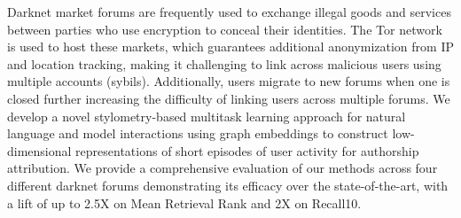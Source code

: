 Darknet market forums are frequently used to exchange illegal goods and services between parties who use encryption to conceal their identities. The Tor network is used to host these markets, which guarantees additional anonymization from IP and location tracking, making it challenging to link across malicious users using multiple accounts (sybils). Additionally, users migrate to new forums when one is closed further increasing the difficulty of linking users across multiple forums. We develop a novel stylometry-based multitask learning approach for natural language and model interactions using graph embeddings to construct low-dimensional representations of short episodes of user activity for authorship attribution. We provide a comprehensive evaluation of our methods across four different darknet forums demonstrating its efficacy over the state-of-the-art, with a lift of up to 2.5X on Mean Retrieval Rank and 2X on Recall\@10.
